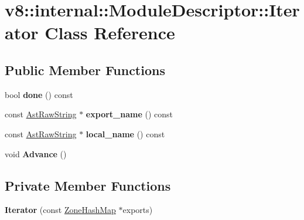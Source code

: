 \hypertarget{classv8_1_1internal_1_1_module_descriptor_1_1_iterator}{}\section{v8\+:\+:internal\+:\+:Module\+Descriptor\+:\+:Iterator Class Reference}
\label{classv8_1_1internal_1_1_module_descriptor_1_1_iterator}
\subsection*{Public Member Functions}
\begin{DoxyCompactItemize}
\item 
bool {\bfseries done} () const \hypertarget{classv8_1_1internal_1_1_module_descriptor_1_1_iterator_a8c480d3367150244d0a1599c912bc2ad}{}\label{classv8_1_1internal_1_1_module_descriptor_1_1_iterator_a8c480d3367150244d0a1599c912bc2ad}

\item 
const \hyperlink{classv8_1_1internal_1_1_ast_raw_string}{Ast\+Raw\+String} $\ast$ {\bfseries export\+\_\+name} () const \hypertarget{classv8_1_1internal_1_1_module_descriptor_1_1_iterator_af0209893c9bc00de4762002f380c738d}{}\label{classv8_1_1internal_1_1_module_descriptor_1_1_iterator_af0209893c9bc00de4762002f380c738d}

\item 
const \hyperlink{classv8_1_1internal_1_1_ast_raw_string}{Ast\+Raw\+String} $\ast$ {\bfseries local\+\_\+name} () const \hypertarget{classv8_1_1internal_1_1_module_descriptor_1_1_iterator_ae3617985d40e2432e94bbe58ae7a51f4}{}\label{classv8_1_1internal_1_1_module_descriptor_1_1_iterator_ae3617985d40e2432e94bbe58ae7a51f4}

\item 
void {\bfseries Advance} ()\hypertarget{classv8_1_1internal_1_1_module_descriptor_1_1_iterator_a851649bc6444203aabcea73eecaa990c}{}\label{classv8_1_1internal_1_1_module_descriptor_1_1_iterator_a851649bc6444203aabcea73eecaa990c}

\end{DoxyCompactItemize}
\subsection*{Private Member Functions}
\begin{DoxyCompactItemize}
\item 
{\bfseries Iterator} (const \hyperlink{classv8_1_1internal_1_1_template_hash_map_impl}{Zone\+Hash\+Map} $\ast$exports)\hypertarget{classv8_1_1internal_1_1_module_descriptor_1_1_iterator_ab2b132295c3ab884f53e2d5fd68c5075}{}\label{classv8_1_1internal_1_1_module_descriptor_1_1_iterator_ab2b132295c3ab884f53e2d5fd68c5075}

\end{DoxyCompactItemize}

